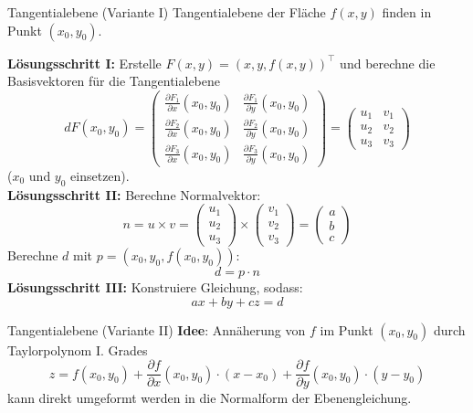 \begin{Rezept}{Tangentialebene (Variante I)}{}
    Tangentialebene der Fläche $f(x, y)$ finden in Punkt $(x_0, y_0)$.
    
    \textbf{Lösungsschritt I:}
    Erstelle $F(x, y) = (x, y, f(x, y))^\top$ und berechne die
    Basisvektoren für die Tangentialebene
    \[
        dF(x_0, y_0) =
            \begin{pmatrix}
                \frac{\partial F_1}{\partial x}(x_0, y_0)&\frac{\partial F_1}{\partial y}(x_0, y_0)\\
                \frac{\partial F_2}{\partial x}(x_0, y_0)&\frac{\partial F_2}{\partial y}(x_0, y_0)\\
                \frac{\partial F_3}{\partial x}(x_0, y_0)&\frac{\partial F_3}{\partial y}(x_0, y_0)
            \end{pmatrix} = 
            \begin{pmatrix}
                u_1&v_1\\
                u_2&v_2\\
                u_3&v_3
            \end{pmatrix}
    \]
    ($x_0$ und $y_0$ einsetzen).\\
    \textbf{Lösungsschritt II:}
    Berechne Normalvektor:
    \[
        n =
        u \times v =
        \begin{pmatrix}
            u_1\\
            u_2\\
            u_3
        \end{pmatrix}
        \times
        \begin{pmatrix}
            v_1\\
            v_2\\
            v_3
        \end{pmatrix} = 
        \begin{pmatrix}
            a\\
            b\\
            c
        \end{pmatrix}
    \]
    Berechne $d$ mit $p=(x_0,y_0,f(x_0,y_0))$:
    \[
        d=p \cdot n
    \]
    \textbf{Lösungsschritt III:} Konstruiere Gleichung, sodass:
    \[
        ax + by + cz = d
    \]
\end{Rezept}

\begin{Rezept}{Tangentialebene (Variante II)}{}
\textbf{Idee}: Annäherung von $f$ im Punkt $(x_0, y_0)$ durch Taylorpolynom I. Grades
\[ z = f(x_0, y_0) + \frac{\partial f}{\partial x}(x_0, y_0)\cdot(x-x_0) + \frac{\partial f}{\partial y}(x_0, y_0)\cdot(y-y_0) \]
kann direkt umgeformt werden in die Normalform der Ebenengleichung.
\end{Rezept}
